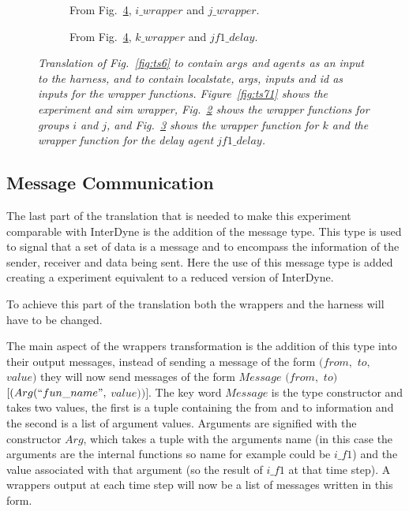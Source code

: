 \documentclass{article}
\begin{document}
\begin{figure}[H]\ContinuedFloat
	\centering
	\begin{subfigure}[b]{1\textwidth}
	
	\caption{From Fig.~\ref{fig:ts7}, $i\_wrapper$ and $j\_wrapper$.}
        \label{fig:ts72}
	\end{subfigure}
	\caption*{}
\end{figure}
	
\begin{figure}[H]\ContinuedFloat
	\centering
	\begin{subfigure}[b]{1\textwidth}
	
	\caption{From Fig.~\ref{fig:ts7}, $k\_wrapper$ and $jf1\_delay$.}
        \label{fig:ts73}
	\end{subfigure}
	\caption{\it Translation of Fig.~\ref{fig:ts6} to contain $args$ and $agents$ as an input to the harness, and to contain localstate, args, inputs and id as inputs for the wrapper functions. Figure~\ref{fig:ts71} shows the experiment and sim wrapper, Fig.~\ref{fig:ts72} shows the wrapper functions for groups $i$ and $j$, and Fig.~\ref{fig:ts73} shows the wrapper function for $k$ and the wrapper function for the delay agent $jf1\_delay$.}
	\label{fig:ts7}
\end{figure} 



\subsection{Message Communication}
The last part of the translation that is needed to make this experiment comparable with InterDyne is the addition of the message type. This type is used to signal that a set of data is a message and to encompass  the information of the sender, receiver and data being sent. Here the use of this message type is added creating a experiment equivalent to a reduced version of InterDyne.   

To achieve this part of the translation both the wrappers and the harness will have to be changed. 

The main aspect of the wrappers transformation is the addition of this type into their output messages, instead of sending a message of the form $(from,$ $to,$ $value)$ they will now send messages of the form  $Message$ $(from,$ $to)$ $[(Arg(``fun\_name",$ $value))]$. The key word $Message$ is the type constructor and takes two values, the first is a tuple containing the from and to information and the second is a list of argument values. Arguments are signified with the constructor $Arg$, which takes a tuple with the arguments name (in this case the arguments are the internal functions so  name for example could be $i\_f1$)  and the value associated with that argument (so the result of $i\_f1$ at that time step). A wrappers output at each time step will now be a list of messages written in this form. 
\end{document}
